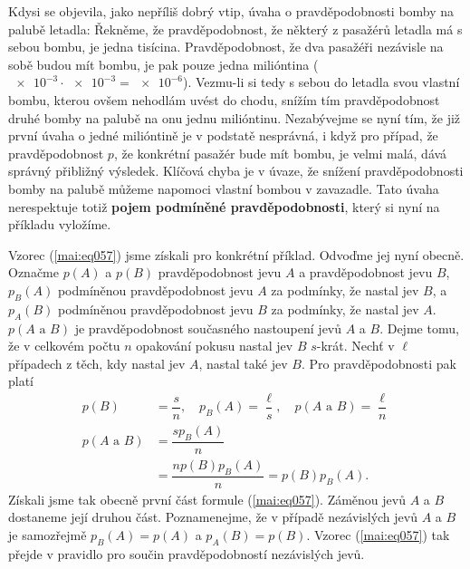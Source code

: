       Kdysi se objevila, jako nepříliš dobrý vtip, úvaha o pravděpodobnosti bomby na palubě letadla:
      Řekněme, že pravděpodobnost, že některý z pasažérů letadla má s sebou bombu, je jedna
      tisícina. Pravděpodobnost, že dva pasažéři nezávisle na sobě budou mít bombu, je pak pouze
      jedna milióntina (\(\num{e-3}\cdot\num{e-3}= \num{e-6}\)). Vezmu-li si tedy s sebou do 
      letadla svou vlastní bombu, kterou ovšem nehodlám uvést do chodu, snížím tím pravděpodobnost 
      druhé bomby na palubě na onu jednu milióntinu. Nezabývejme se nyní tím, že již první úvaha o 
      jedné milióntině je v podstatě nesprávná, i když pro případ, že pravděpodobnost \(p\), že 
      konkrétní pasažér bude mít bombu, je velmi malá, dává správný přibližný výsledek. Klíčová 
      chyba je v úvaze, že snížení pravděpodobnosti bomby na palubě můžeme napomoci vlastní bombou 
      v zavazadle. Tato úvaha nerespektuje totiž \textbf{pojem podmíněné pravděpodobnosti}, který 
      si nyní na příkladu vyložíme.
      
      

      Vzorec (\ref{mai:eq057}) jsme získali pro konkrétní příklad. Odvoďme jej nyní obecně. Označme
      \(p(A)\) a \(p(B)\) pravděpodobnost jevu \(A\) a pravděpodobnost jevu \(B\), \(p_B(A)\)
      podmíněnou pravděpodobnost jevu \(A\) za podmínky, že nastal jev \(B\), a \(p_A(B)\)
      podmíněnou pravděpodobnost jevu \(B\) za podmínky, že nastal jev \(A\). \(p(A\text{ a }B)\) je
      pravděpodobnost současného nastoupení jevů \(A\) a \(B\). Dejme tomu, že v celkovém počtu
      \(n\) opakování pokusu nastal jev \(B\) \(s\)-krát. Nechť v \(\ell\) případech z těch, kdy
      nastal jev \(A\), nastal také jev \(B\). Pro pravděpodobnosti pak platí
      \begin{align*}
        p(B) &= \dfrac{s}{n}, \quad p_B(A) = \dfrac{\ell}{s}, 
                              \quad p(A\text{ a }B) = \dfrac{\ell}{n}  \\
        p(A\text{ a }B) &= \dfrac{sp_B(A)}{n}                          \\ 
             &= \dfrac{np(B)p_B(A)}{n} = p(B)p_B(A).
      \end{align*}
      Získali jsme tak obecně první část formule (\ref{mai:eq057}). Záměnou jevů \(A\) a \(B\) 
      dostaneme její druhou část. Poznamenejme, že v případě nezávislých jevů \(A\) a \(B\) je 
      samozřejmě \(p_B(A) = p(A)\) a \(p_A(B) = p(B)\). Vzorec (\ref{mai:eq057}) tak přejde v 
      pravidlo pro součin pravděpodobností nezávislých jevů.
            
